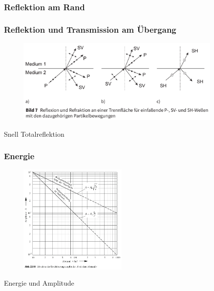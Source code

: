 \begin{frame}
\frametitle{Reflektion am Rand}

\end{frame}


\begin{frame}
\frametitle{Reflektion und Transmission am Übergang}
\begin{figure}
\includegraphics[width=0.9\textwidth]{fig_img/wave_transition} 
\caption*{\cite{Vrettos2017}}
\end{figure}

Snell
Totalreflektion
\end{frame}

\begin{frame}
\frametitle{Energie}
\begin{figure}
\includegraphics[width=0.475\textwidth]{fig_img/wave_geometrical_damping} 
\caption*{\cite{Schmidt2017}}
\end{figure}
Energie und Amplitude
\end{frame}


